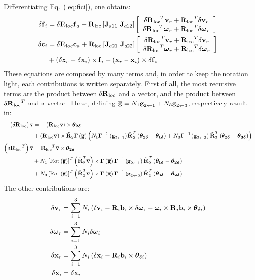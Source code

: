 Differentiating Eq.~(\ref{eq:fici}), one obtains:
\begin{align}
	\delta\bm{\mathbf{f}}_i &= \delta{\bm{\mathbf{R}}_{\text{loc}}} \bm{\mathbf{f}}_a 
		+ {\bm{\mathbf{R}}_{\text{loc}}} \left[ \bm{\mathbf{J}}_{a11}\ \bm{\mathbf{J}}_{a12} \right]
		\left[ \begin{array}{ c } 
		\delta{\bm{\mathbf{R}}_{\text{loc}}}^T\bm{\mathbf{v}}_r + {\bm{\mathbf{R}}_{\text{loc}}}^T\delta\bm{\mathbf{v}}_r\\
		\delta{\bm{\mathbf{R}}_{\text{loc}}}^T\bm{\mathbf{\omega}}_r + {\bm{\mathbf{R}}_{\text{loc}}}^T\delta\bm{\mathbf{\omega}}_r \end{array} \right]\\
\nonumber\delta\bm{\mathbf{c}}_i &= \delta{\bm{\mathbf{R}}_{\text{loc}}} \bm{\mathbf{c}}_a 
		+ {\bm{\mathbf{R}}_{\text{loc}}} \left[ \bm{\mathbf{J}}_{a21}\ \bm{\mathbf{J}}_{a22} \right]
		\left[ \begin{array}{ c } 
		\delta{\bm{\mathbf{R}}_{\text{loc}}}^T\bm{\mathbf{v}}_r + {\bm{\mathbf{R}}_{\text{loc}}}^T\delta\bm{\mathbf{v}}_r\\
		\delta{\bm{\mathbf{R}}_{\text{loc}}}^T\bm{\mathbf{\omega}}_r + {\bm{\mathbf{R}}_{\text{loc}}}^T\delta\bm{\mathbf{\omega}}_r \end{array} \right]\\
	&+ \left( \delta\bm{\mathbf{x}}_r - \delta\bm{\mathbf{x}}_i \right)\times\bm{\mathbf{f}}_i 
		+ \left( \bm{\mathbf{x}}_r - \bm{\mathbf{x}}_i \right)\times\delta\bm{\mathbf{f}}_i
\end{align}
These equations are composed by many terms and, in order to keep the
notation light, each contributions is written separately.
First of all, the most recursive terms are the product between 
$\delta{\bm{\mathbf{R}}_{\text{loc}}}$ and a vector, and the product between $\delta{\bm{\mathbf{R}}_{\text{loc}}}^T$
and a vector. These, defining $\overline{\bm{\mathbf{g}}}=N_1\bm{\mathbf{g}}_{2\leftarrow{1}} 
+ N_3\bm{\mathbf{g}}_{2\leftarrow{3}}$, 
respectively result in:
\newcommand{\vv}{\T{\overline{v}}}
\begin{align}
\nonumber	\plbr{\delta\Rloc}\vv &= 
		-\plbr{\Rloc\vv}\times\T{\theta_{2\delta}}\\ 
\nonumber	&+\plbr{\Rloc\vv}\times
		\Rtilde{2}\T{\Gamma}\plbr{\overline{\T{g}}}\plbr{
			N_1 \T{\Gamma}^{-1}\plbr{\T{g}_{2\leftarrow{1}}}\Rtilde{2}^T
			\plbr{\T{\theta_{2\delta}}-\T{\theta_{1\delta}}}
			+N_3 \T{\Gamma}^{-1}\plbr{\T{g}_{2\leftarrow{3}}}\Rtilde{2}^T
			\plbr{\T{\theta_{2\delta}}-\T{\theta_{3\delta}}}
		} \\
\nonumber	\plbr{\delta\Rloc^T}\vv &= 
		\Rloc^T\vv\times\T{\theta_{2\delta}}\\ 
\nonumber	&+N_1\sqbr{\Rot{\overline{\T{g}}}}^T
			\plbr{\Rtilde{2}^T\vv}\times
		\T{\Gamma}\plbr{\overline{\T{g}}}
		\T{\Gamma}^{-1}\plbr{\T{g}_{2\leftarrow{1}}}\Rtilde{2}^T
		\plbr{\T{\theta_{1\delta}}-\T{\theta_{2\delta}}}\\ 
\nonumber	&+N_3\sqbr{\Rot{\overline{\T{g}}}}^T
			\plbr{\Rtilde{2}^T\vv}\times
		\T{\Gamma}\plbr{\overline{\T{g}}}
		\T{\Gamma}^{-1}\plbr{\T{g}_{2\leftarrow{3}}}\Rtilde{2}^T
		\plbr{\T{\theta_{3\delta}}-\T{\theta_{2\delta}}}\\ 
\end{align}
The other contributions are:
\begin{align}
	\delta\bm{\mathbf{v}}_r &= \sum_{i=1}^3N_i\left( \delta\bm{\mathbf{v}}_i 
			- \bm{\mathbf{R}}_i\bm{\mathbf{b}}_i\times\delta\bm{\mathbf{\omega}}_i
			- \bm{\mathbf{\omega}}_i\times\bm{\mathbf{R}}_i\bm{\mathbf{b}}_i
			\times\bm{\mathbf{\theta}}_{\delta i} \right)\\
	\delta\bm{\mathbf{\omega}}_r &= \sum_{i=1}^3N_i\delta\bm{\mathbf{\omega}}_i\\ 
	\delta\bm{\mathbf{x}}_r &= \sum_{i=1}^3N_i\left( \delta\bm{\mathbf{x}}_i 
			- \bm{\mathbf{R}}_i\bm{\mathbf{b}}_i\times\bm{\mathbf{\theta}}_{\delta i} \right)\\
	\delta\bm{\mathbf{x}}_i &= \delta\bm{\mathbf{x}}_i
\end{align}



